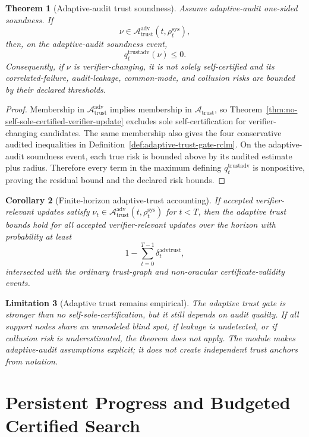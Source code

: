 \documentclass[11pt,a4paper]{article}
\newtheorem{theorem}{Theorem}[section]
\newtheorem{corollary}[theorem]{Corollary}
\newtheorem{limitation}[theorem]{Limitation}
\newcommand{\Acal}{\mathcal A}
\newcommand{\adv}{\mathrm{adv}}
\newcommand{\sys}{\mathrm{sys}}
\newcommand{\trust}{\mathrm{trust}}
\newcommand{\trustadv}{\mathrm{trustadv}}
\newcommand{\advtrust}{\mathrm{advtrust}}
\begin{document}
\begin{theorem}[Adaptive-audit trust soundness]
\label{thm:adaptive-audit-trust-soundness}
Assume adaptive-audit one-sided soundness.  If
\[
\nu\in\Acal_{\trust}^{\adv}(t,\rho_t^{\sys}),
\]
then, on the adaptive-audit soundness event,
\[
q_t^{\trustadv}(\nu)
\le0.
\]
Consequently, if \(\nu\) is verifier-changing, it is not solely self-certified and its correlated-failure, audit-leakage, common-mode, and collusion risks are bounded by their declared thresholds.
\end{theorem}

\begin{proof}
Membership in \(\Acal_{\trust}^{\adv}\) implies membership in \(\Acal_{\trust}\), so Theorem~\ref{thm:no-self-sole-certified-verifier-update} excludes sole self-certification for verifier-changing candidates.  The same membership also gives the four conservative audited inequalities in Definition~\ref{def:adaptive-trust-gate-rclm}.  On the adaptive-audit soundness event, each true risk is bounded above by its audited estimate plus radius.  Therefore every term in the maximum defining \(q_t^{\trustadv}\) is nonpositive, proving the residual bound and the declared risk bounds.
\end{proof}

\begin{corollary}[Finite-horizon adaptive-trust accounting]
\label{cor:finite-horizon-adaptive-trust}
If accepted verifier-relevant updates satisfy \(\nu_t\in\Acal_{\trust}^{\adv}(t,\rho_t^{\sys})\) for \(t<T\), then the adaptive trust bounds hold for all accepted verifier-relevant updates over the horizon with probability at least
\[
1-\sum_{t=0}^{T-1}\delta_t^{\advtrust},
\]
intersected with the ordinary trust-graph and non-oracular certificate-validity events.
\end{corollary}

\begin{limitation}[Adaptive trust remains empirical]
The adaptive trust gate is stronger than no self-sole-certification, but it still depends on audit quality.  If all support nodes share an unmodeled blind spot, if leakage is undetected, or if collusion risk is underestimated, the theorem does not apply.  The module makes adaptive-audit assumptions explicit; it does not create independent trust anchors from notation.
\end{limitation}

\section{Persistent Progress and Budgeted Certified Search}
\label{sec:persistent-progress-search}
\end{document}

